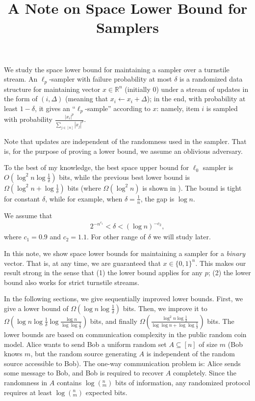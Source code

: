 \documentclass[10pt]{article}
\title{A Note on Space Lower Bound for Samplers}
\begin{document}
	
\maketitle

We study the space lower bound for maintaining a sampler over a turnstile stream. An $\ell_p$-sampler with failure probability at most $\delta$ is a randomized data structure for maintaining vector $x\in \mathbb{R}^n$ (initially 0) under a stream of updates in the form of $(i, \Delta)$ (meaning that $x_i \leftarrow x_i+\Delta$); in the end, with probability at least $1-\delta$, it gives an ``$\ell_p$-sample'' according to $x$: namely, item $i$ is sampled with probability $\frac{|x_i|^p}{\sum_{j\in [n]}{|x_j|^p}}$. 

Note that updates are independent of the randomness used in the sampler. That is, for the purpose of proving a lower bound, we assume an oblivious adversary. 

To the best of my knowledge, the best space upper bound for $\ell_0$ sampler is $O(\log^2 n \log \frac{1}{\delta})$ bits, while the previous best lower bound is $\Omega(\log^2 n +\log\frac{1}{\delta})$ bits (where $\Omega(\log^2 n)$ is shown in \cite{jowhari2011tight}). The bound is tight for constant $\delta$, while for example, when $\delta=\frac{1}{n}$, the gap is $\log n$. 

We assume that 
\begin{align} \label{formula:delta-range}
2^{-n^{c_1}}<\delta<(\log n)^{-c_2},
\end{align}
where $c_1=0.9$ and $c_2=1.1$. For other range of $\delta$ we will study later.

In this note, we show space lower bounds for maintaining a sampler for a {\em binary} vector. That is, at any time, we are guaranteed that $x\in \{0,1\}^n$. This makes our result strong in the sense that (1) the lower bound applies for any $p$; (2) the lower bound also works for strict turnstile streams.

In the following sections, we give sequentially improved lower bounds. First, we give a lower bound of $\Omega(\log n \log \frac{1}{\delta})$ bits. Then, we improve it to $\Omega(\log n \log {\frac{1}{\delta}} \log \frac{\log n}{\log\log \frac{1}{\delta}})$ bits, and finally $\Omega(\frac{\log^2 n \log \frac{1}{\delta}}{\log\log n + \log\log \frac{1}{\delta}})$ bits. The lower bounds are based on communication complexity in the public random coin model. Alice wants to send Bob a uniform random set $A\subseteq [n]$ of size $m$ (Bob knows $m$, but the random source generating $A$ is independent of the random source accessible to Bob). The one-way communication problem is: Alice sends some message to Bob, and Bob is required to recover $A$ completely. Since the randomness in $A$ contains $\log (^n_m)$ bits of information, any randomized protocol requires at least $\log (^n_m)$ expected bits. 
\end{document}

